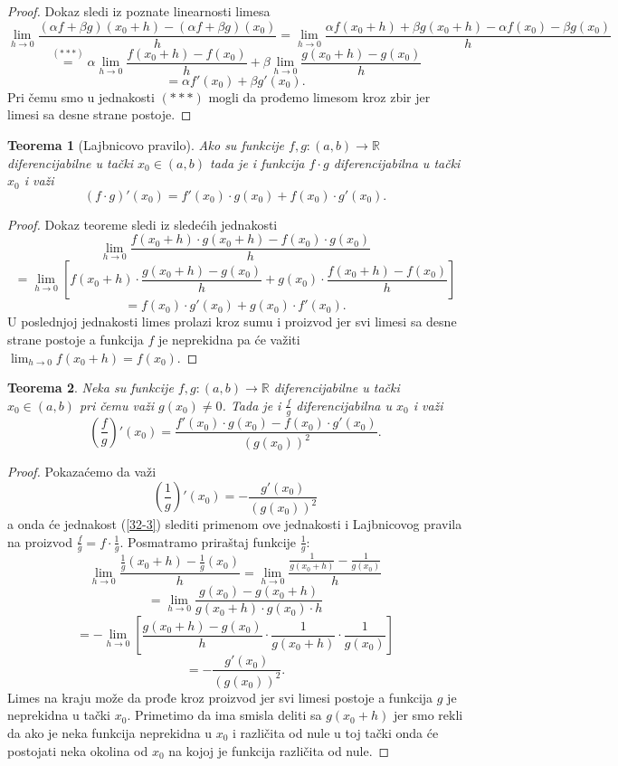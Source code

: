 \documentclass[a4paper,12pt]{article}
\theoremstyle{plain}
\newtheorem{theorem}{Teorema}[section]
\theoremstyle{definition}
\theoremstyle{remark}
\begin{document}
\begin{proof}
Dokaz sledi iz poznate linearnosti limesa
$$ \lim_{h \to 0} \frac{(\alpha f + \beta g)(x_0 + h) - (\alpha f + \beta g)(x_0)}{h} = \lim_{h \to 0} \frac{\alpha f(x_0 + h) + \beta g(x_0 + h) - \alpha f(x_0) - \beta g(x_0)}{h} $$
$$ \overset{(***)}{=} \alpha \lim_{h \to 0} \frac{f(x_0 + h) - f(x_0)}{h} + \beta \lim_{h \to 0} \frac{g(x_0 + h) - g(x_0)}{h} $$
$$ = \alpha f'(x_0) + \beta g'(x_0). $$
Pri čemu smo u jednakosti $(***)$ mogli da prođemo limesom kroz zbir jer limesi sa desne strane postoje.
\end{proof}

\begin{theorem}[Lajbnicovo pravilo]
Ako su funkcije $f, g : (a, b) \to \mathbb{R}$ diferencijabilne u tački $x_0 \in (a, b)$ tada je i funkcija $f \cdot g$ diferencijabilna u tački $x_0$ i važi
$$ (f \cdot g)'(x_0) = f'(x_0) \cdot g(x_0) + f(x_0) \cdot g'(x_0). $$
\end{theorem}

\begin{proof}
Dokaz teoreme sledi iz sledećih jednakosti
$$ \lim_{h \to 0} \frac{f(x_0 + h) \cdot g(x_0 + h) - f(x_0) \cdot g(x_0)}{h} $$
$$ = \lim_{h \to 0} \left[ f(x_0 + h) \cdot \frac{g(x_0 + h) - g(x_0)}{h} + g(x_0) \cdot \frac{f(x_0 + h) - f(x_0)}{h} \right] $$
$$ = f(x_0) \cdot g'(x_0) + g(x_0) \cdot f'(x_0). $$
U poslednjoj jednakosti limes prolazi kroz sumu i proizvod jer svi limesi sa desne strane postoje a funkcija $f$ je neprekidna pa će važiti $\lim_{h \to 0} f(x_0 + h) = f(x_0)$.
\end{proof}

\begin{theorem}
Neka su funkcije $f, g : (a, b) \to \mathbb{R}$ diferencijabilne u tački $x_0 \in (a, b)$ pri čemu važi $g(x_0) \neq 0$. Tada je i $\frac{f}{g}$ diferencijabilna u $x_0$ i važi
\begin{equation} \left(\frac{f}{g}\right)'(x_0) = \frac{f'(x_0) \cdot g(x_0) - f(x_0) \cdot g'(x_0)}{(g(x_0))^2}. \label{32-3} \end{equation}
\end{theorem}

\begin{proof}
Pokazaćemo da važi
$$ \left(\frac{1}{g}\right)'(x_0) = -\frac{g'(x_0)}{(g(x_0))^2} $$
a onda će jednakost (\ref{32-3}) slediti primenom ove jednakosti i Lajbnicovog pravila na proizvod $\frac{f}{g} = f \cdot \frac{1}{g}$. Posmatramo priraštaj funkcije $\frac{1}{g}$:
$$ \lim_{h \to 0} \frac{\frac{1}{g}(x_0 + h) - \frac{1}{g}(x_0)}{h} = \lim_{h \to 0} \frac{\frac{1}{g(x_0+h)} - \frac{1}{g(x_0)}}{h} $$
$$ = \lim_{h \to 0} \frac{g(x_0) - g(x_0 + h)}{g(x_0 + h) \cdot g(x_0) \cdot h} $$
$$ = -\lim_{h \to 0} \left[ \frac{g(x_0 + h) - g(x_0)}{h} \cdot \frac{1}{g(x_0 + h)} \cdot \frac{1}{g(x_0)} \right] $$
$$ = -\frac{g'(x_0)}{(g(x_0))^2}. $$
Limes na kraju može da prođe kroz proizvod jer svi limesi postoje a funkcija $g$ je neprekidna u tački $x_0$. Primetimo da ima smisla deliti sa $g(x_0+h)$ jer smo rekli da ako je neka funkcija neprekidna u $x_0$ i različita od nule u toj tački onda će postojati neka okolina od $x_0$ na kojoj je funkcija različita od nule.
\end{proof}
\end{document}
